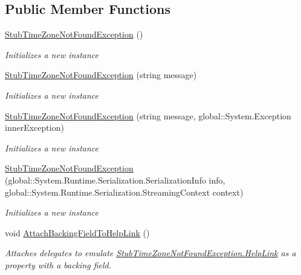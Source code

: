 \subsection*{Public Member Functions}
\begin{DoxyCompactItemize}
\item 
\hyperlink{class_system_1_1_fakes_1_1_stub_time_zone_not_found_exception_a2a46efeca0f4d46abf153848744871be}{Stub\-Time\-Zone\-Not\-Found\-Exception} ()
\begin{DoxyCompactList}\small\item\em Initializes a new instance\end{DoxyCompactList}\item 
\hyperlink{class_system_1_1_fakes_1_1_stub_time_zone_not_found_exception_aaaacde2b3a5fa3cc7800bb07bb8de086}{Stub\-Time\-Zone\-Not\-Found\-Exception} (string message)
\begin{DoxyCompactList}\small\item\em Initializes a new instance\end{DoxyCompactList}\item 
\hyperlink{class_system_1_1_fakes_1_1_stub_time_zone_not_found_exception_a79cb40b96a02d2fe002710fda59187dd}{Stub\-Time\-Zone\-Not\-Found\-Exception} (string message, global\-::\-System.\-Exception inner\-Exception)
\begin{DoxyCompactList}\small\item\em Initializes a new instance\end{DoxyCompactList}\item 
\hyperlink{class_system_1_1_fakes_1_1_stub_time_zone_not_found_exception_a58616bf72f0cdb3084d9c8f09a6d9602}{Stub\-Time\-Zone\-Not\-Found\-Exception} (global\-::\-System.\-Runtime.\-Serialization.\-Serialization\-Info info, global\-::\-System.\-Runtime.\-Serialization.\-Streaming\-Context context)
\begin{DoxyCompactList}\small\item\em Initializes a new instance\end{DoxyCompactList}\item 
void \hyperlink{class_system_1_1_fakes_1_1_stub_time_zone_not_found_exception_ace28337ae15356660f102853b441f8c1}{Attach\-Backing\-Field\-To\-Help\-Link} ()
\begin{DoxyCompactList}\small\item\em Attaches delegates to emulate \hyperlink{class_system_1_1_fakes_1_1_stub_time_zone_not_found_exception_aff8fe84deba7f91411e7b36c264867b1}{Stub\-Time\-Zone\-Not\-Found\-Exception.\-Help\-Link} as a property with a backing field.\end{DoxyCompactList}\item 

\end{DoxyCompactItemize}
